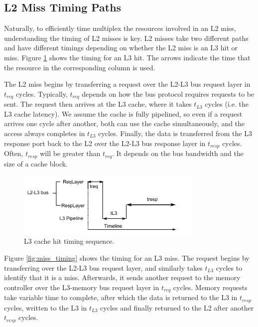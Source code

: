 \subsection{L2 Miss Timing Paths}
Naturally, to efficiently time multiplex the resources involved in an L2 miss, 
understanding the timing of L2 misses is key. L2 misses take two different 
paths and have different timings depending on whether the L2 miss is an L3 hit 
or miss. Figure \ref{fig:hit_timing} shows the timing for an L3 hit. The arrows 
indicate the time that the resource in the corresponding column is used.

The L2 miss begins by transferring a request over the L2-L3 bus request layer 
in $t_{req}$ cycles. Typically, $t_{req}$ depends on how the bus protocol 
requires requests to be sent. The request then arrives at the L3 cache, where 
it takes $t_{L3}$ cycles (i.e. the L3 cache latency). We assume the cache is 
fully pipelined, so even if a request arrives one cycle after another, both can 
use the cache simultaneously, and the access always completes in $t_{L3}$ 
cycles. Finally, the data is transferred from the L3 response port back to the 
L2 over the L2-L3 bus response layer in $t_{resp}$ cycles. Often, $t_{resp}$ 
will be greater than $t_{req}$. It depends on the bus bandwidth and the size of 
a cache block.

\begin{figure}
    \begin{center}
        \includegraphics[width=3.5in]{figs/hit_timing.pdf}
        \caption{L3 cache hit timing sequence.}
        \label{fig:hit_timing}
    \end{center}
\end{figure}

Figure \ref{fig:miss_timing} shows the timing for an L3 miss. The request 
begins by transferring over the L2-L3 bus request layer, and similarly takes 
$t_{L3}$ cycles to identify that it is a miss. Afterwards, it sends another 
request to the memory controller over the L3-memory bus request layer in 
$t_{req}$ cycles. Memory requests take variable time to complete, after which 
the data is returned to the L3 in $t_{resp}$ cycles, written to the L3 in 
$t_{L3}$ cycles and finally returned to the L2 after another $t_{resp}$ cycles.

